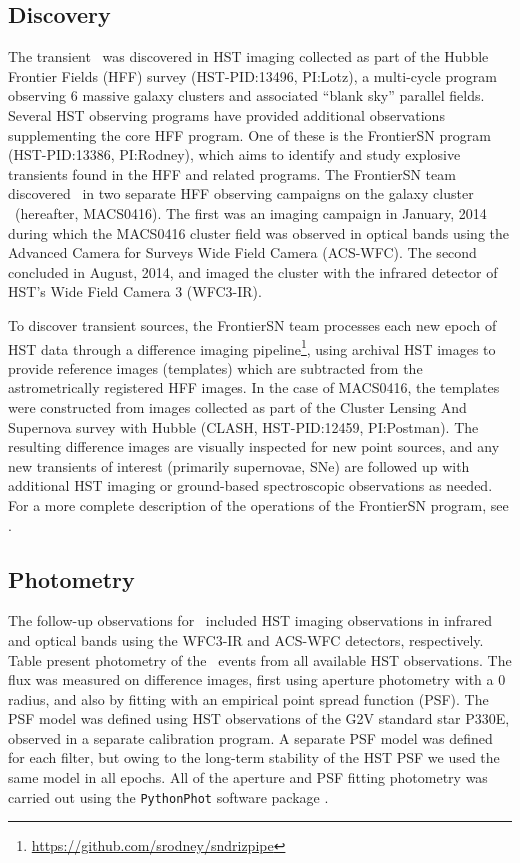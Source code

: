 \subsection{Discovery}\label{sec:Discovery}

The transient \spock\ was discovered in HST imaging collected as part
of the Hubble Frontier Fields (HFF) survey (HST-PID:13496, PI:Lotz), a
multi-cycle program observing 6 massive galaxy clusters and associated
``blank sky'' parallel fields.  Several HST observing programs have
provided additional observations supplementing the core HFF program.
One of these is the FrontierSN program (HST-PID:13386, PI:Rodney),
which aims to identify and study explosive transients found in the HFF
and related programs.  The FrontierSN team discovered \spock\ in two
separate HFF observing campaigns on the galaxy cluster
\ (hereafter, MACS0416).  The first was an imaging campaign
in January, 2014 during which the MACS0416 cluster field was observed
in optical bands using the Advanced Camera for Surveys Wide Field
Camera (ACS-WFC).  The second concluded in August, 2014, and imaged
the cluster with the infrared detector of HST's Wide Field Camera 3
(WFC3-IR).

To discover transient sources, the FrontierSN team processes each new
epoch of HST data through a difference imaging
pipeline\footnote{\url{https://github.com/srodney/sndrizpipe}}, using
archival HST images to provide reference images (templates) which are
subtracted from the astrometrically registered HFF images. In the case
of MACS0416, the templates were constructed from images collected as
part of the Cluster Lensing And Supernova survey with Hubble (CLASH,
HST-PID:12459, PI:Postman). The resulting difference images are
visually inspected for new point sources, and any new transients of
interest (primarily supernovae, SNe) are followed up with additional
HST imaging or ground-based spectroscopic observations as needed.  For
a more complete description of the operations of the FrontierSN
program, see \citet{Rodney:2015a}.


\subsection{Photometry}\label{sec:Photometry}

The follow-up observations for \spock\ included HST imaging
observations in infrared and optical bands using the WFC3-IR and
ACS-WFC detectors, respectively. Table  %
present photometry of the \spock\ events from all available HST
observations. The flux was measured on difference images, first using
aperture photometry with a 0 radius, and also by fitting with
an empirical point spread function (PSF).  The PSF model was defined
using HST observations of the G2V standard star P330E, observed in a
separate calibration program.  A separate PSF model was defined for
each filter, but owing to the long-term stability of the HST PSF we
used the same model in all epochs.  All of the aperture and PSF
fitting photometry was carried out using the {\tt PythonPhot} software
package \citep{Jones:2015}.


